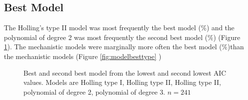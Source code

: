 \documentclass{article}
\begin{document}
\subsection{Best Model}
The Holling's type II model was most frequently the best model ($\%$) and the polynomial of degree 2 was most frequently the second best model ($\%$) (Figure \ref{fig:bestmodel}).
The mechanistic models were marginally more often the best model ($\%$)than the mechanistic models (Figure \ref{fig:modelbesttype} )
\begin{figure}[h!]
\centering
{}
\caption{Best and second best model from the lowest and second lowest AIC values. Models are Holling type I, Holling type II, Holling type II, polynomial of degree 2, polynomial of degree 3. $n=241$}
\label{fig:bestmodel}
\end{figure}
\end{document}
